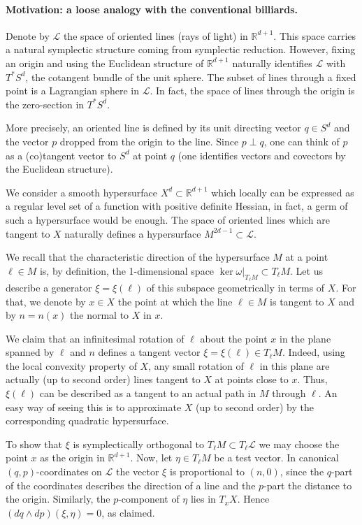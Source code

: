 \documentclass[12pt]{article}
\newcommand{\R}{{\mathbb R}}
\begin{document}
\paragraph{Motivation: a loose analogy with the conventional billiards.} Denote by ${\mathcal L}$  the space of oriented lines (rays of light) in $\R^{d+1}$. This space carries a natural symplectic structure coming from symplectic reduction. However, fixing an origin and using the Euclidean structure of $\R^{d+1}$ naturally identifies ${\mathcal L}$ with $T^* S^d$, the cotangent bundle of the unit sphere. The subset of lines through a fixed point is a Lagrangian sphere in ${\mathcal L}$. In fact, the space of lines through the origin is the zero-section in $T^*S^d$.

More precisely, an oriented line is defined by its unit directing vector $q \in S^d$ and the vector $p$ dropped from the origin to the line. Since $p \perp q$, one can think of $p$ as a (co)tangent vector to $S^d$ at point $q$ (one identifies vectors and covectors by the Euclidean structure). 

We consider a smooth hypersurface $X^d \subset \R^{d+1}$ which locally can be expressed as a regular level set of a function with positive definite Hessian, in fact, a germ of such a hypersurface would be enough. The space of oriented lines which are tangent to $X$  naturally defines a hypersurface $M^{2d-1} \subset {\mathcal L}$. 

We recall that the characteristic direction of the hypersurface $M$ at a point $\ell\in M$ is, by definition, the 1-dimensional space $\ker \omega|_{T_\ell M}\subset T_\ell M$. Let us describe a generator $\xi=\xi(\ell)$ of this subspace geometrically in terms of $X$. For that, we denote by $x\in X$ the point at which the line $\ell\in M$ is tangent to $X$ and by $n=n(x)$ the normal to $X$ in $x$. 

We claim that an infinitesimal rotation of $\ell$ about the point $x$ in the plane spanned by $\ell$ and $n$ defines a tangent vector $\xi=\xi(\ell) \in T_\ell M$. Indeed, using the local convexity property of $X$, any small rotation of $\ell$ in this plane are actually (up to second order) lines tangent to $X$ at points close to $x$. Thus, $\xi(\ell)$ can be described as a tangent to an actual path in $M$ through $\ell$. An easy way of seeing this is to approximate $X$ (up to second order) by the corresponding quadratic hypersurface.
 
To show that $\xi$ is symplectically orthogonal to $T_\ell M \subset T_\ell {\mathcal L}$ we may choose the point $x$ as the origin in $\R^{d+1}$. Now, let $\eta \in T_\ell M$ be a test vector. In canonical $(q,p)$-coordinates on $\mathcal L$ the vector $\xi$ is proportional to $(n,0)$, since the $q$-part of the coordinates describes the direction of a line and the $p$-part the distance to the origin. Similarly, the $p$-component of $\eta$ lies in $T_x X$. Hence $(dq \wedge dp) (\xi,\eta)=0$, as claimed. 
\end{document}
